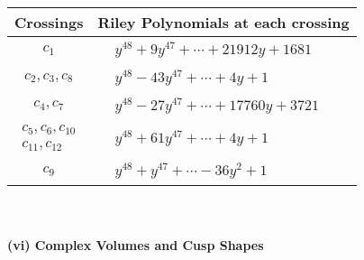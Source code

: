 \documentclass[1p]{elsarticle_modified}
\theoremstyle{definition}
\begin{document}
\begin{tabular}{m{50pt}|m{274pt}}
Crossings & \hspace{64pt}Riley Polynomials at each crossing \\
\hline $$\begin{aligned}c_{1}\end{aligned}$$&$\begin{aligned}
&y^{48}+9 y^{47}+\cdots+21912 y+1681
\end{aligned}$\\
\hline $$\begin{aligned}c_{2},c_{3},c_{8}\end{aligned}$$&$\begin{aligned}
&y^{48}-43 y^{47}+\cdots+4 y+1
\end{aligned}$\\
\hline $$\begin{aligned}c_{4},c_{7}\end{aligned}$$&$\begin{aligned}
&y^{48}-27 y^{47}+\cdots+17760 y+3721
\end{aligned}$\\
\hline $$\begin{aligned}c_{5},c_{6},c_{10}\\c_{11},c_{12}\end{aligned}$$&$\begin{aligned}
&y^{48}+61 y^{47}+\cdots+4 y+1
\end{aligned}$\\
\hline $$\begin{aligned}c_{9}\end{aligned}$$&$\begin{aligned}
&y^{48}+y^{47}+\cdots-36 y^2+1
\end{aligned}$\\
\hline
\end{tabular}\\~\\
\newpage\flushleft \textbf{(vi) Complex Volumes and Cusp Shapes}
\end{document}
